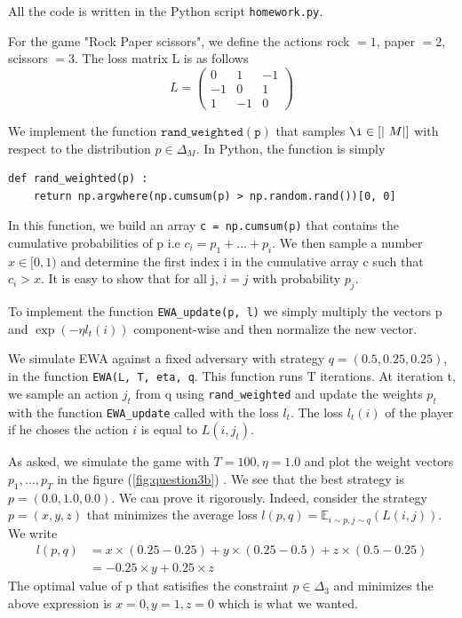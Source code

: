 
All the code is written in the Python script \texttt{homework.py}.

 For the game "Rock Paper scissors", we define the actions rock $= 1$, paper $= 2$, scissors $= 3$. The loss matrix L is as follows 
\begin{equation*}
	L = \begin{pmatrix}
		0 & 1 & -1 \\
		-1 & 0 & 1 \\
		1 & -1 & 0
	\end{pmatrix}
\end{equation*}


 We implement the function $\mathtt{rand\_weighted(p)}$ that samples $\i \in [| M |]$ with respect to the distribution $p \in \Delta_M$. In Python, the function is simply
\begin{lstlisting}
def rand_weighted(p) :
	return np.argwhere(np.cumsum(p) > np.random.rand())[0, 0]
\end{lstlisting}
In this function, we build an array \texttt{c = np.cumsum(p)} that contains the cumulative probabilities of p i.e $c_i = p_1 + ... + p_i$. We then sample a number $x \in [0, 1)$ and determine the first index i in the 
cumulative array c such that $c_i > x$. It is easy to show that for all j, $i = j$ with probability $p_j$. 

 To implement the function \texttt{EWA\_update(p, l)} we simply multiply the vectors p and $\exp{(- \eta  l_t(i) )}$ component-wise and then normalize the new vector.

  We simulate EWA against a fixed adversary with strategy $q = (0.5, 0.25, 0.25)$, in the function \texttt{EWA(L, T, eta, q}. This function runs T iterations. At iteration t, we sample an action $j_t$ from q using \texttt{rand\_weighted} and update the weights $p_t$ with the function \texttt{EWA\_update} called with the loss $l_t$. The loss $l_t(i)$ of the player if he choses the action $i$ is equal to $L(i, j_t)$. 

 As asked, we simulate the game with $T = 100, \eta = 1.0$ and plot the weight vectors $p_1, ..., p_T$ in the figure (\ref{fig:question3b}) . We see that the best strategy is $p = (0.0, 1.0, 0.0)$. We can prove it rigorously. Indeed, consider the strategy $p =(x, y, z)$ that minimizes the average loss $l(p, q) = \mathbb{E}_{i \sim p, j \sim q}(L(i, j))$. We write 
\begin{align*}
	l(p, q) &= x \times (0.25 - 0.25) + y \times (0.25 - 0.5) + z \times (0.5 - 0.25) \\
	&= -0.25 \times y + 0.25 \times z
\end{align*}
The optimal value of p that satisifies the constraint $p \in \Delta_3$ and minimizes the above expression is $x = 0, y = 1, z = 0$ which is what we wanted. 

